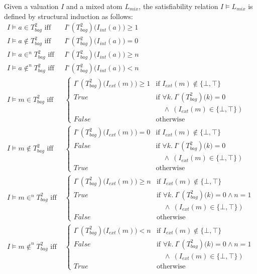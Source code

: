 Given a valuation $I$ and a mixed atom $L_{mix}$, the satisfiability relation $I \models L_{mix}$ is defined by structural induction as follows:
\begin{align*}
I \models a\in T^2_{bag} \mbox{ iff }& I^\circ(T^2_{bag})\big(I_{int}(a)\big) \ge 1 \\
I \models a\notin T^2_{bag} \mbox{ iff }& I^\circ(T^2_{bag})\big(I_{int}(a)\big) = 0 \\
I \models a\in^{n} T^2_{bag} \mbox{ iff }& I^\circ(T^2_{bag})\big(I_{int}(a)\big) \ge n \\
I \models a\notin^{n} T^2_{bag} \mbox{ iff }& I^\circ(T^2_{bag})\big(I_{int}(a)\big) < n \\
I \models m\in T^2_{bag} \mbox{ iff }& \left\{\begin{array}{ll}
I^\circ(T^2_{bag})\big(I_{ext}(m)\big) \ge 1 & \mbox{if } I_{ext}(m)\not\in\{\bot ,\top\} \\
True & \mbox{if } \forall k.~I^\circ(T^2_{bag})\big(k) = 0 \\
     &\quad \land\ (I_{ext}(m) \in \{\bot,\top\})\\
False & \mbox{otherwise}
\end{array}\right.\\
I \models m\notin T^2_{bag} \mbox{ iff }& \left\{\begin{array}{ll}
I^\circ(T^2_{bag})\big(I_{ext}(m)\big) = 0 & \mbox{if } I_{ext}(m)\not\in\{\bot ,\top\} \\
False & \mbox{if } \forall k.~I^\circ(T^2_{bag})\big(k) = 0 \\
     &\quad \land\ (I_{ext}(m) \in \{\bot,\top\})\\
True & \mbox{otherwise}
\end{array}\right.\\
I \models m\in^{n} T^2_{bag} \mbox{ iff }& \left\{\begin{array}{ll}
I^\circ(T^2_{bag})\big(I_{ext}(m)\big) \ge n & \mbox{if } I_{ext}(m)\not\in\{\bot ,\top\} \\
True & \mbox{if } \forall k.~I^\circ(T^2_{bag})\big(k) = 0  \land n = 1\\
     &\quad \land\ (I_{ext}(m) \in \{\bot,\top\})\\
False & \mbox{otherwise}
\end{array}\right.\\
I \models m\notin^{n} T^2_{bag} \mbox{ iff }& \left\{\begin{array}{ll}
I^\circ(T^2_{bag})\big(I_{ext}(m)\big) < n & \mbox{if } I_{ext}(m)\not\in\{\bot ,\top\} \\
False & \mbox{if } \forall k.~I^\circ(T^2_{bag})\big(k) = 0 \land n = 1\\
     &\quad \land\ (I_{ext}(m) \in \{\bot,\top\})\\
True & \mbox{otherwise}
\end{array}\right.\\
\end{align*}

